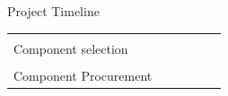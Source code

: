 \documentclass[aspectratio=169]{beamer}
\begin{document}
\begin{frame}{Project Timeline}
\begin{table}[]
\begin{adjustbox}{totalheight=\baselineskip,center}
\begin{tabular}{|l|l|l|l|l|l|}
					&
					&
					&
					&
					\\ \hline
					&
					&
					&
					&
					\cellcolor[HTML]{93C47D} &
					\cellcolor[HTML]{93C47D} \\ \cline{2-6} 
					\multirow{-2}{*}{Component selection} &
					&
					&
					&
					\cellcolor[HTML]{6D9EEB} &
					\\ \hline
					&
					&
					&
					&
					&
					\cellcolor[HTML]{93C47D} \\ \cline{2-6} 
					\multirow{-2}{*}{Component Procurement} &
					&
					&
					&
					&
					\\ \hline
				\end{tabular}
			\end{adjustbox}
		\end{table}
	\end{frame}
	
	
	
\end{document}
